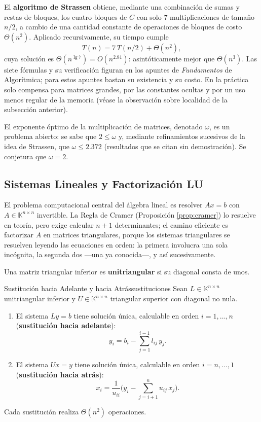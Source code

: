 \documentclass[11pt, a4paper]{article}
\begin{document}
El \textbf{algoritmo de Strassen} obtiene, mediante una combinación de sumas y restas de bloques, los cuatro bloques de $C$ con solo $7$ multiplicaciones de tamaño $n/2$, a cambio de una cantidad constante de operaciones de bloques de costo $\Theta(n^2)$. Aplicado recursivamente, su tiempo cumple
\[
T(n) = 7 \, T(n/2) + \Theta(n^2),
\]
cuya solución es $\Theta(n^{\lg 7}) = O(n^{2.81})$: asintóticamente mejor que $\Theta(n^3)$. Las siete fórmulas y su verificación figuran en los apuntes de \emph{Fundamentos} de Algorítmica; para estos apuntes bastan su existencia y su costo. En la práctica solo compensa para matrices grandes, por las constantes ocultas y por un uso menos regular de la memoria (véase la observación sobre localidad de la subsección anterior).

\obs El exponente óptimo de la multiplicación de matrices, denotado $\omega$, es un problema abierto: se sabe que $2 \le \omega$ y, mediante refinamientos sucesivos de la idea de Strassen, que $\omega \le 2.372$ (resultados que se citan sin demostración). Se conjetura que $\omega = 2$.

\subsection{Sistemas Lineales y Factorización LU}

El problema computacional central del álgebra lineal es resolver $Ax = b$ con $A \in \mathbb{K}^{n \times n}$ invertible. La Regla de Cramer (Proposición \ref{prop:cramer}) lo resuelve en teoría, pero exige calcular $n+1$ determinantes; el camino eficiente es factorizar $A$ en matrices triangulares, porque los sistemas triangulares se resuelven leyendo las ecuaciones en orden: la primera involucra una sola incógnita, la segunda dos —una ya conocida—, y así sucesivamente.

Una matriz triangular inferior es \textbf{unitriangular} si su diagonal consta de unos.

\begin{proposicion}{Sustitución hacia Adelante y hacia Atrás}{sustituciones}
Sean $L \in \mathbb{K}^{n \times n}$ unitriangular inferior y $U \in \mathbb{K}^{n \times n}$ triangular superior con diagonal no nula.
\begin{enumerate}
    \item El sistema $Ly = b$ tiene solución única, calculable en orden $i = 1, \dots, n$ (\textbf{sustitución hacia adelante}):
    \[
    y_i = b_i - \sum_{j=1}^{i-1} l_{ij} \, y_j.
    \]
    \item El sistema $Ux = y$ tiene solución única, calculable en orden $i = n, \dots, 1$ (\textbf{sustitución hacia atrás}):
    \[
    x_i = \frac{1}{u_{ii}} \Big( y_i - \sum_{j=i+1}^{n} u_{ij} \, x_j \Big).
    \]
\end{enumerate}
Cada sustitución realiza $\Theta(n^2)$ operaciones.
\end{proposicion}
\end{document}
